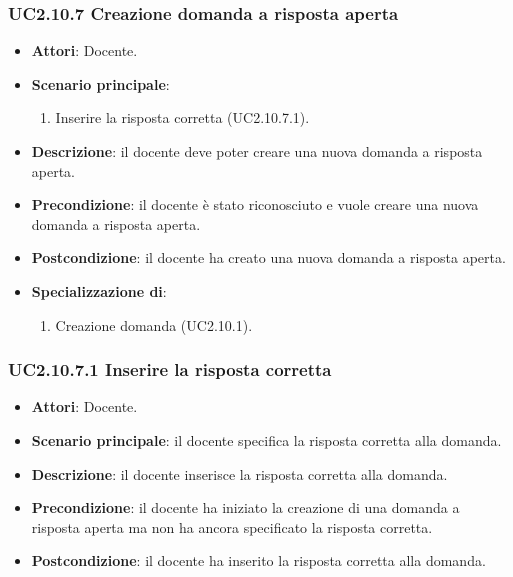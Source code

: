 \subsubsection{UC2.10.7 Creazione domanda a risposta aperta}
\begin{itemize}
\item \textbf{Attori}: Docente.
\item \textbf{Scenario principale}:
\begin{enumerate}
\item Inserire la risposta corretta (UC2.10.7.1).
\end{enumerate}
\item \textbf{Descrizione}: il docente deve poter creare una nuova domanda a risposta aperta.
\item \textbf{Precondizione}: il docente è stato riconosciuto e vuole creare una nuova domanda a risposta aperta.
\item \textbf{Postcondizione}: il docente ha creato una nuova domanda a risposta aperta.
\item \textbf{Specializzazione di}:
\begin{enumerate}
\item Creazione domanda (UC2.10.1).
\end{enumerate}
\end{itemize}
\subsubsection{UC2.10.7.1 Inserire la risposta corretta}
\begin{itemize}
\item \textbf{Attori}: Docente.
\item \textbf{Scenario principale}: il docente specifica la risposta corretta alla domanda.
\item \textbf{Descrizione}: il docente inserisce la risposta corretta alla domanda.
\item \textbf{Precondizione}: il docente ha iniziato la creazione di una domanda a risposta aperta ma non ha ancora specificato la risposta corretta.
\item \textbf{Postcondizione}: il docente ha inserito la risposta corretta alla domanda.
\end{itemize}
